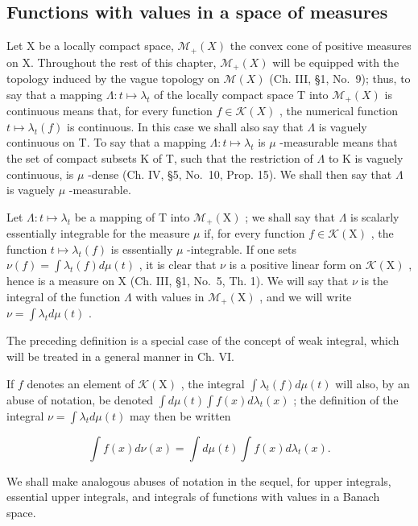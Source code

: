 \subsection{Functions with values in a space of measures}

Let X be a locally compact space, \(\mathcal{M}_{+}(X)\) the convex cone of positive measures on X. Throughout the rest of this chapter, \(\mathcal{M}_{+}(X)\) will be equipped with the topology induced by the vague topology on \(\mathcal{M}(X)\) (Ch. III, §1, No.~9); thus, to say that a mapping \(\Lambda: t \mapsto \lambda_{t}\) of the locally compact space T into \(\mathcal{M}_{+}(X)\) is continuous means that, for every function \(f \in \mathcal{K}(X)\) , the numerical function \(t \mapsto \lambda_{t}(f)\) is continuous. In this case we shall also say that \(\Lambda\) is vaguely continuous on T. To say that a mapping \(\Lambda: t \mapsto \lambda_{t}\) is \(\mu\) -measurable means that the set of compact subsets K of T, such that the restriction of \(\Lambda\) to K is vaguely continuous, is \(\mu\) -dense (Ch. IV, §5, No.~10, Prop. 15). We shall then say that \(\Lambda\) is vaguely \(\mu\) -measurable.

Let \(\Lambda : t \mapsto \lambda_t\) be a mapping of T into \(\mathcal{M}_+(\mathrm{X})\) ; we shall say that \(\Lambda\) is scalarly essentially integrable for the measure \(\mu\) if, for every function \(f \in \mathcal{K}(\mathrm{X})\) , the function \(t \mapsto \lambda_t(f)\) is essentially \(\mu\) -integrable. If one sets \(\nu(f) = \int \lambda_t(f) d\mu(t)\) , it is clear that \(\nu\) is a positive linear form on \(\mathcal{K}(\mathrm{X})\) , hence is a measure on X (Ch. III, §1, No.~5, Th. 1). We will say that \(\nu\) is the integral of the function \(\Lambda\) with values in \(\mathcal{M}_+(\mathrm{X})\) , and we will write \(\nu = \int \lambda_t d\mu(t)\) .

The preceding definition is a special case of the concept of weak integral, which will be treated in a general manner in Ch. VI.

If \(f\) denotes an element of \(\mathcal{K}(\mathrm{X})\) , the integral \(\int \lambda_t(f) d\mu(t)\) will also, by an abuse of notation, be denoted \(\int d\mu(t) \int f(x) d\lambda_t(x)\) ; the definition of the integral \(\nu = \int \lambda_t d\mu(t)\) may then be written

\[
\int f (x) d \nu (x) = \int d \mu (t) \int f (x) d \lambda_ {t} (x).\tag{1}
\]

We shall make analogous abuses of notation in the sequel, for upper integrals, essential upper integrals, and integrals of functions with values in a Banach space.

